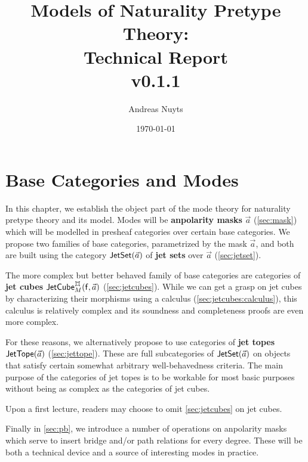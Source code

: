 \documentclass[a4paper]{memoir}
\newcommand{\thetitle}{Models of Naturality Pretype Theory: \\ Technical Report \\ v0.1.1}
\newcommand{\theauthors}{Andreas Nuyts}
\begin{document}
	\addtolength{\voffset}{-.5in}

\title{\thetitle}
\date{\today}
\author{\theauthors{}}
\maketitle

\pagebreak

\tableofcontents


\chapter{Base Categories and Modes} \label{ch:modes}

In this chapter, we establish the object part of the mode theory for naturality pretype theory and its model.
Modes will be \textbf{anpolarity masks} $\vec a$ (\cref{sec:mask}) which will be modelled in presheaf categories over certain base categories.
We propose two families of base categories, parametrized by the mask $\vec a$, and both are built using the category $\mathsf{JetSet}(\vec a)$ of \textbf{jet sets} over $\vec a$ (\cref{sec:jetset}).

The more complex but better behaved family of base categories are categories of \textbf{jet cubes} $\jetcubefwd \mycubex M {\vec a}$ (\cref{sec:jetcubes}).
While we can get a grasp on jet cubes by characterizing their morphisms using a calculus (\cref{sec:jetcubes:calculus}), this calculus is relatively complex and its soundness and completeness proofs are even more complex.

For these reasons, we alternatively propose to use categories of \textbf{jet topes} $\mathsf{JetTope}(\vec a)$ (\cref{sec:jettope}). These are full subcategories of $\mathsf{JetSet}(\vec a)$ on objects that satisfy certain somewhat arbitrary well-behavedness criteria.
The main purpose of the categories of jet topes is to be workable for most basic purposes without being as complex as the categories of jet cubes.

Upon a first lecture, readers may choose to omit \cref{sec:jetcubes} on jet cubes.

Finally in \cref{sec:pb}, we introduce a number of operations on anpolarity masks which serve to insert bridge and/or path relations for every degree.
These will be both a technical device and a source of interesting modes in practice.
\end{document}
